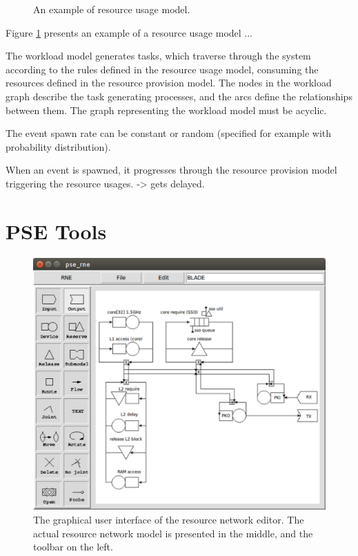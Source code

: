 \begin{figure}[h!]
  \begin{center}
    \caption{An example of resource usage model.}
    \label{fig:resource-usage-model}
  \end{center}
\end{figure}

Figure \ref{fig:resource-usage-model} presents an example of a resource usage model ...

The workload model generates tasks, which traverse through the system according to the rules defined in the resource usage model, consuming the resources defined in the resource provision model. The nodes in the workload graph describe the task generating processes, and the arcs define the relationships between them. The graph representing the workload model must be acyclic.

The event spawn rate can be constant or random (specified for example with probability distribution).

When an event is spawned, it progresses through the resource provision model triggering the resource usages. -> gets delayed.

\section{PSE Tools}


\begin{figure}[h]
  \begin{center}
    \includegraphics[width=\textwidth]{images/rne-example.pdf}
    \caption{The graphical user interface of the resource network editor. The actual resource network model is presented in the middle, and the toolbar on the left.}
    \label{fig:rne-example}
  \end{center}
\end{figure}

